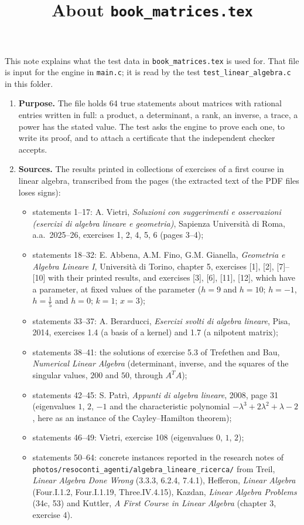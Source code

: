 \documentclass[11pt,a4paper]{article}
\title{About \texttt{book\_matrices.tex}}
\author{}
\date{}
\begin{document}
\maketitle
This note explains what the test data in \texttt{book\_matrices.tex} is used for. That file is input for the engine in \texttt{main.c}; it is read by the test \texttt{test\_linear\_algebra.c} in this folder.

\begin{enumerate}
\item \textbf{Purpose.} The file holds 64 true statements about matrices with rational entries written in full: a product, a determinant, a rank, an inverse, a trace, a power has the stated value. The test asks the engine to prove each one, to write its proof, and to attach a certificate that the independent checker accepts.

\item \textbf{Sources.} The results printed in collections of exercises of a first course in linear algebra, transcribed from the pages (the extracted text of the PDF files loses signs):
\begin{itemize}
\item statements 1--17: A. Vietri, \emph{Soluzioni con suggerimenti e osservazioni (esercizi di algebra lineare e geometria)}, Sapienza Universit\`a di Roma, a.a.\ 2025--26, exercises 1, 2, 4, 5, 6 (pages 3--4);
\item statements 18--32: E. Abbena, A.M. Fino, G.M. Gianella, \emph{Geometria e Algebra Lineare I}, Universit\`a di Torino, chapter 5, exercises [1], [2], [7]--[10] with their printed results, and exercises [3], [6], [11], [12], which have a parameter, at fixed values of the parameter ($h = 9$ and $h = 10$; $h = -1$, $h = \frac{1}{5}$ and $h = 0$; $k = 1$; $x = 3$);
\item statements 33--37: A. Berarducci, \emph{Esercizi svolti di algebra lineare}, Pisa, 2014, exercises 1.4 (a basis of a kernel) and 1.7 (a nilpotent matrix);
\item statements 38--41: the solutions of exercise 5.3 of Trefethen and Bau, \emph{Numerical Linear Algebra} (determinant, inverse, and the squares of the singular values, $200$ and $50$, through $A^{T}A$);
\item statements 42--45: S. Patr\`i, \emph{Appunti di algebra lineare}, 2008, page 31 (eigenvalues $1$, $2$, $-1$ and the characteristic polynomial $-\lambda^{3} + 2\lambda^{2} + \lambda - 2$, here as an instance of the Cayley--Hamilton theorem);
\item statements 46--49: Vietri, exercise 108 (eigenvalues $0$, $1$, $2$);
\item statements 50--64: concrete instances reported in the research notes of \texttt{photos/resoconti\_agenti/algebra\_lineare\_ricerca/} from Treil, \emph{Linear Algebra Done Wrong} (3.3.3, 6.2.4, 7.4.1), Hefferon, \emph{Linear Algebra} (Four.I.1.2, Four.I.1.19, Three.IV.4.15), Kazdan, \emph{Linear Algebra Problems} (34c, 53) and Kuttler, \emph{A First Course in Linear Algebra} (chapter 3, exercise 4).
\end{itemize}


\end{enumerate}
\end{document}
